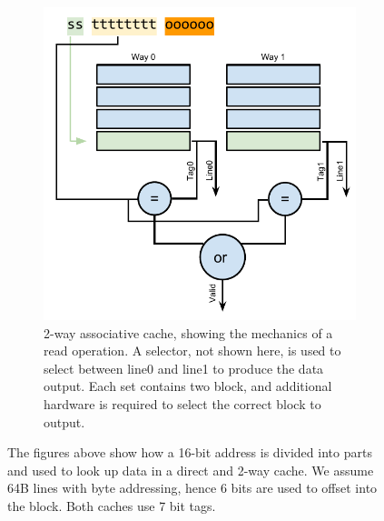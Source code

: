 \begin{figure}
\begin{subfigure}[b]{0.5\textwidth}
        \includegraphics[width=\textwidth]{figures/introduction/2waycache_read}
        \caption{2-way associative cache, showing the mechanics of a read operation. A selector, not shown here, is used to select between line0 and line1 to produce the data output. Each set contains two block, and additional hardware is required to select the correct block to output.}
        \label{fig:introduction:cache:2way}
    \end{subfigure}
    \caption{The figures above show how a 16-bit address is divided into parts and used to look up data in a direct and 2-way cache. We assume 64B lines with byte addressing, hence 6 bits are used to offset into the block. Both caches use 7 bit tags.}
    \label{fig:introduction:cache}
\end{figure}

